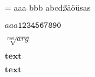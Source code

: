 \documentclass[ngerman,cdfont=normalbold,cdfont=heavy]{tudscrreprt}
\begin{document}
\makeatletter
\ifnum\pdf@shellescape=\@ne\relax%
aaa
\else
bbb
\fi
\makeatother
abcdßäöüsas

$aaa\mathtt{1234567890}$



\blindtext

\texttt{\blindtext}

\clearpage
\bfseries\boldmath

\blindtext

\texttt{\blindtext}
\clearpage

%
%
%
%
%
%



$\sqrt[root]{arg}$

$\mathbf{text}$

\blindtext

\begingroup
\bfseries
\boldmath

$\mathbf{text}$

\bfdefault

\blindtext

\endgroup

\blindtext

\blinddocument

%
%
%
%
\blindtext\clearpage
%
%


\blindtext\clearpage

%
%
%
%
%
%
%
%
%
\end{document}
